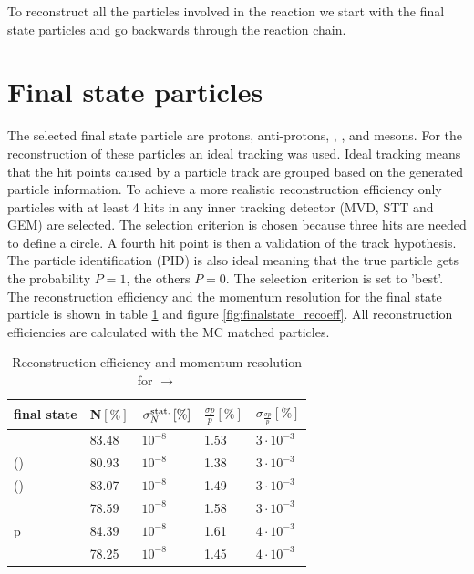 To reconstruct all the particles involved in the reaction we start with the final state particles and go backwards through the reaction chain.

\section{Final state particles}
	The selected final state particle are protons, anti-protons, \piminus, \piplus, \kminus and \kplus mesons.
	For the reconstruction of these particles an ideal tracking was used.
	Ideal tracking means that the hit points caused by a particle track are grouped based on the generated particle information. 
	To achieve a more realistic reconstruction efficiency only particles with at least 4 hits in any inner tracking detector (MVD, STT and GEM)
	are selected.
	The selection criterion is chosen because three hits are needed to define a circle.
	A fourth hit point is then a validation of the track hypothesis.\\
	The particle identification (PID) is also ideal meaning that the true particle gets the probability $P=1$, the others $P=0$. 
	The selection criterion is set to 'best'.\vspace{11pt} \\
	The reconstruction efficiency and the momentum resolution for the final state particle is shown in table \ref{tab:finalstate_recoeff} and figure \ref{fig:finalstate_recoeff}.
	All reconstruction efficiencies are calculated with the MC matched particles.
	
	\begin{table}
		\centering
		\caption{\propose Reconstruction efficiency and momentum resolution for \pbarpSystem $\rightarrow$ \excitedcascade \anticascade}
		\label{tab:finalstate_recoeff}
		\begin{tabular}{lllll}
			\hline
			final state & N$\left[\%\right]$ & $\sigma_N^{\textnormal{stat.}}\left[\%\right]$ &$\frac{\sigma p}{p}\left[\%\right]$ & $\sigma_\frac{\sigma p}{p}\left[\%\right]$ \\
			\hline
			\hline
			\piminus & 83.48 & $10^{-8}$& 1.53 & $3\cdot 10^{-3}$\\
			\piplusone(\anticascade) &  80.93& $10^{-8}$& 1.38 & $3\cdot 10^{-3}$ \\
			\piplustwo(\alam) &  83.07& $10^{-8}$&1.49 & $3\cdot 10^{-3}$\\
			\kminus&  78.59& $10^{-8}$& 1.58 & $3\cdot 10^{-3}$\\
			p &  84.39& $10^{-8}$& 1.61 & $4\cdot 10^{-3}$\\
			\antiproton & 78.25 &$10^{-8}$& 1.45 & $4\cdot 10^{-3}$\\\hline
			 
		\end{tabular}
	\end{table}
	
